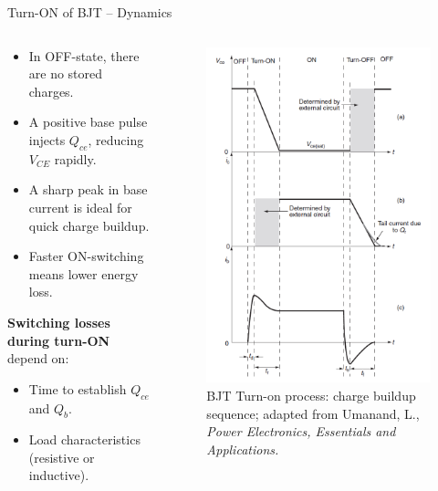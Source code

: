 \begin{frame}{Turn-ON of BJT – Dynamics}
  \begin{columns}
    \begin{column}{0.5\textwidth}
\begin{itemize}
    \item In OFF-state, there are no stored charges.
    \item A positive base pulse injects $Q_{ce}$, reducing $V_{CE}$ rapidly.
    \item A sharp peak in base current is ideal for quick charge buildup.
    \item Faster ON-switching means lower energy loss.
\end{itemize}

\textbf{Switching losses during turn-ON} depend on:
\begin{itemize}
    \item Time to establish $Q_{ce}$ and $Q_b$.
    \item Load characteristics (resistive or inductive).
\end{itemize}
    \end{column}

    \begin{column}{0.5\textwidth}
\begin{figure}
    \centering
    \includegraphics[width=0.5\linewidth]{fig/lec04/BJT_turn_on.png}
    \caption{BJT Turn-on process: charge buildup sequence; adapted from Umanand, L., \textit{Power Electronics, Essentials and Applications.}}
\end{figure}
    \end{column}
\end{columns}
\end{frame}



